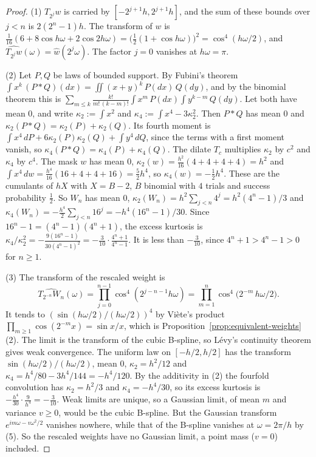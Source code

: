 \begin{proof}
(1) $T_{2^j}w$ is carried by $[-2^{j+1}h, 2^{j+1}h]$, and the sum of these bounds over $j < n$ is
$2(2^n - 1)h$. The transform of $w$ is $\tfrac1{16}(6 + 8\cos h\omega + 2\cos 2h\omega)
= \bigl(\tfrac12(1 + \cos h\omega)\bigr)^2 = \cos^4(h\omega/2)$, and
$\widehat{T_{2^j}w}(\omega) = \widehat w(2^j\omega)$. The factor $j = 0$ vanishes at
$h\omega = \pi$.

(2) Let $P, Q$ be laws of bounded support. By Fubini's theorem
$\int x^k\,(P * Q)(dx) = \iint(x + y)^k\,P(dx)\,Q(dy)$, and by the binomial theorem this is
$\sum_{m \le k}\frac{k!}{m!\,(k-m)!}\int x^m\,P(dx)\int y^{k-m}\,Q(dy)$. Let both have mean $0$,
and write $\kappa_2 := \int x^2$ and $\kappa_4 := \int x^4 - 3\kappa_2^2$. Then $P * Q$ has mean
$0$ and $\kappa_2(P * Q) = \kappa_2(P) + \kappa_2(Q)$. Its fourth moment is
$\int x^4\,dP + 6\kappa_2(P)\kappa_2(Q) + \int y^4\,dQ$, since the terms with a first moment
vanish, so $\kappa_4(P * Q) = \kappa_4(P) + \kappa_4(Q)$. The dilate $T_c$ multiplies
$\kappa_2$ by $c^2$ and $\kappa_4$ by $c^4$. The mask $w$ has mean $0$,
$\kappa_2(w) = \tfrac{h^2}{16}(4 + 4 + 4 + 4) = h^2$ and
$\int x^4\,dw = \tfrac{h^4}{16}(16 + 4 + 4 + 16) = \tfrac52h^4$, so $\kappa_4(w) = -\tfrac12h^4$.
These are the cumulants of $hX$ with $X = B - 2$, $B$ binomial with $4$ trials and success
probability $\tfrac12$. So $W_n$ has mean $0$,
$\kappa_2(W_n) = h^2\sum_{j<n}4^j = h^2(4^n - 1)/3$ and
$\kappa_4(W_n) = -\tfrac{h^4}2\sum_{j<n}16^j = -h^4(16^n - 1)/30$. Since
$16^n - 1 = (4^n - 1)(4^n + 1)$, the excess kurtosis is
$\kappa_4/\kappa_2^2 = -\tfrac{9(16^n - 1)}{30(4^n - 1)^2} = -\tfrac3{10}\cdot\tfrac{4^n + 1}{4^n - 1}$.
It is less than $-\tfrac3{10}$, since $4^n + 1 > 4^n - 1 > 0$ for $n \ge 1$.

(3) The transform of the rescaled weight is
\[
  \widehat{T_{2^{-n}}W_n}(\omega) = \prod_{j=0}^{n-1}\cos^4(2^{j-n-1}h\omega)
  = \prod_{m=1}^{n}\cos^4\bigl(2^{-m}\,h\omega/2\bigr).
\]
It tends to $(\sin(h\omega/2)/(h\omega/2))^4$ by Viète's product
$\prod_{m \ge 1}\cos(2^{-m}x) = \sin x/x$, which is Proposition~\ref{prop:equivalent-weights}(2). The
limit is the transform of the cubic B-spline, so Lévy's continuity theorem gives weak convergence.
The uniform law on $[-h/2,h/2]$ has the transform $\sin(h\omega/2)/(h\omega/2)$, mean $0$,
$\kappa_2 = h^2/12$ and $\kappa_4 = h^4/80 - 3h^4/144 = -h^4/120$. By the additivity in (2) the
fourfold convolution has $\kappa_2 = h^2/3$ and $\kappa_4 = -h^4/30$, so its excess kurtosis is
$-\tfrac{h^4}{30}\cdot\tfrac{9}{h^4} = -\tfrac3{10}$. Weak limits are unique, so a Gaussian limit,
of mean $m$ and variance $v \ge 0$, would be the cubic B-spline. But the Gaussian transform
$e^{im\omega - v\omega^2/2}$ vanishes nowhere, while that of the B-spline vanishes at
$\omega = 2\pi/h$ by (5). So the rescaled weights have no Gaussian limit, a point mass ($v = 0$)
included.


\end{proof}
